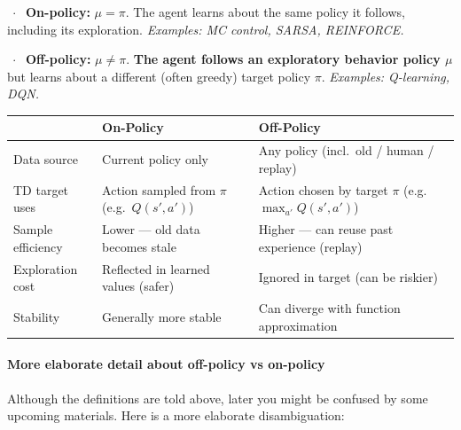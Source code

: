 \documentclass[11pt]{article}
\newcounter{none}
\begin{document}
\(\;\cdot\;\) \textbf{On-policy:} \(\mu = \pi\). The agent learns about
the same policy it follows, including its exploration. \emph{Examples:
MC control, SARSA, REINFORCE.}

\(\;\cdot\;\) \textbf{Off-policy:} \(\mu \neq \pi\). \textbf{The agent
follows an exploratory behavior policy \(\mu\)} but learns about a
different (often greedy) target policy \(\pi\). \emph{Examples:
Q-learning, DQN.}

{\def\LTcaptype{none} %
\begin{longtable}[]{@{}
  >{\raggedright\arraybackslash}p{}
  >{\raggedright\arraybackslash}p{}
  >{\raggedright\arraybackslash}p{}@{}}
\toprule\noalign{}
\begin{minipage}[b]{\linewidth}\raggedright
\end{minipage} & \begin{minipage}[b]{\linewidth}\raggedright
On-Policy
\end{minipage} & \begin{minipage}[b]{\linewidth}\raggedright
Off-Policy
\end{minipage} \\
\midrule\noalign{}
\endhead
\bottomrule\noalign{}
\endlastfoot
Data source & Current policy only & Any policy (incl.~old / human /
replay) \\
TD target uses & Action sampled from \(\pi\) (e.g.~\(Q(s',a')\)) &
Action chosen by target \(\pi\) (e.g.~\(\max_{a'} Q(s',a')\)) \\
Sample efficiency & Lower --- old data becomes stale & Higher --- can
reuse past experience (replay) \\
Exploration cost & Reflected in learned values (safer) & Ignored in
target (can be riskier) \\
Stability & Generally more stable & Can diverge with function
approximation \\
\end{longtable}
}

\paragraph{More elaborate detail about off-policy vs
on-policy}\label{more-elaborate-detail-about-off-policy-vs-on-policy}

Although the definitions are told above, later you might be confused by
some upcoming materials. Here is a more elaborate disambiguation:
\end{document}
